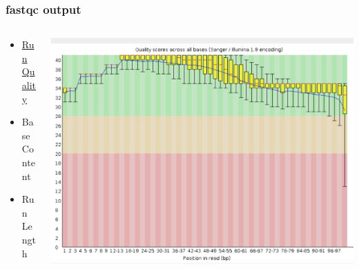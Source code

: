 \documentclass[14pt,handout]{beamer}
\begin{document}
\begin{frame}
\frametitle{fastqc output}
\begin{columns}
	\begin{column}{0.35\textwidth}
		\begin{itemize}
			\item<+-> \underline{Run Quality}
			\item<+-> Base Content
			\item<+-> Run Length
		\end{itemize}
		\end{column}
	\begin{column}{0.65\textwidth}
		\begin{center}
     		\includegraphics[width=1\textwidth]{images_20171012_run_qual.png}
     	\end{center}
	\end{column}
\end{columns}
\end{frame}
\end{document}
